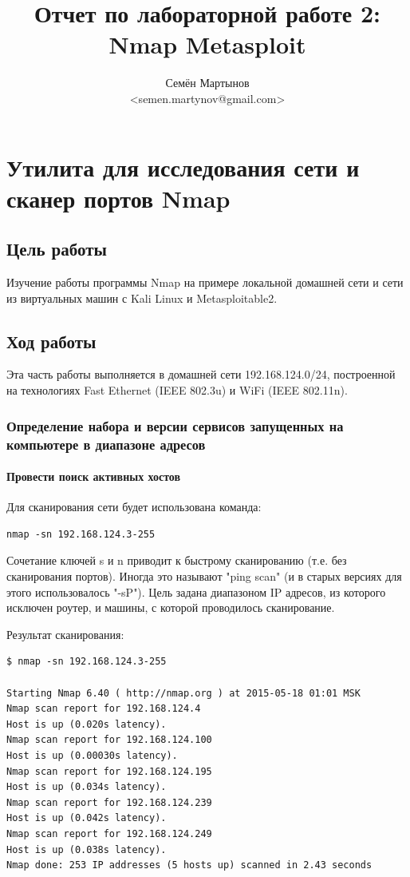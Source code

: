 \documentclass[a4paper, 12pt]{article}		%
\author{Семён Мартынов\\<semen.martynov@gmail.com>}
\title{Отчет по лабораторной работе 2:\\Nmap Metasploit}
\begin{document}
\maketitle
\tableofcontents{}

\newpage
\section{Утилита для исследования сети и сканер портов Nmap}

\subsection{Цель работы}

Изучение работы программы Nmap на примере локальной домашней сети и сети из виртуальных машин с Kali Linux и Metasploitable2.

\subsection{Ход работы}

Эта часть работы выполняется в домашней сети 192.168.124.0/24, построенной на технологиях Fast Ethernet (IEEE 802.3u) и WiFi (IEEE 802.11n).

\subsubsection{Определение набора и версии сервисов запущенных на компьютере в диапазоне адресов}

\paragraph{Провести поиск активных хостов} Для сканирования сети будет использована команда:
\begin{Verbatim}[frame=single]
nmap -sn 192.168.124.3-255
\end{Verbatim}

Сочетание ключей s и n приводит к быстрому сканированию (т.е. без сканирования портов). Иногда это называют "ping scan" (и в старых версиях для этого использовалось "-sP"). Цель задана диапазоном IP адресов, из которого исключен роутер, и машины, с которой проводилось сканирование.

Результат сканирования:
\begin{Verbatim}[frame=single]
$ nmap -sn 192.168.124.3-255

Starting Nmap 6.40 ( http://nmap.org ) at 2015-05-18 01:01 MSK
Nmap scan report for 192.168.124.4
Host is up (0.020s latency).
Nmap scan report for 192.168.124.100
Host is up (0.00030s latency).
Nmap scan report for 192.168.124.195
Host is up (0.034s latency).
Nmap scan report for 192.168.124.239
Host is up (0.042s latency).
Nmap scan report for 192.168.124.249
Host is up (0.038s latency).
Nmap done: 253 IP addresses (5 hosts up) scanned in 2.43 seconds
\end{Verbatim}
\end{document}
